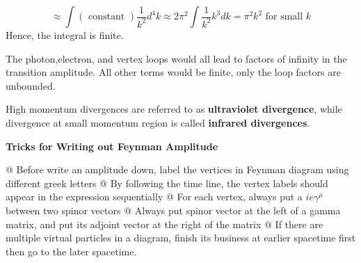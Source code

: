 $$
\approx \int(\text { constant }) \frac{1}{k^{2}} d^{4} k \approx2 \pi^{2} \int \frac{1}{k^{2}} k^{3} d k=\pi^{2} k^{2} \text { for small } k
$$
Hence, the integral is finite.
\begin{qt}
        The photon,electron, and vertex loops would all lead to factors of infinity in the transition amplitude. All other terms would be finite, only the loop factors are unbounded.
        
        High momentum divergences are referred to as \textbf{ultraviolet divergence}, while divergence at small momentum region is called \textbf{infrared divergences}.
\end{qt}

\begin{qt}
\textbf{Tricks for Writing out Feynman Amplitude}

\begin{easylist}
\NewList
@ Before write an amplitude down, label the vertices in Feynman diagram using different greek letters
@ By following the time line, the vertex labels should appear in the expression sequentially
@ For each vertex, always put a $ie\gamma^{\mu}$ between two spinor vectors
@ Always put spinor vector at the left of a gamma matrix, and put its adjoint vector at the right of the matrix
@ If there are multiple virtual particles in a diagram, finish its business at earlier spacetime first then go to the later spacetime.
\end{easylist}
\end{qt}

